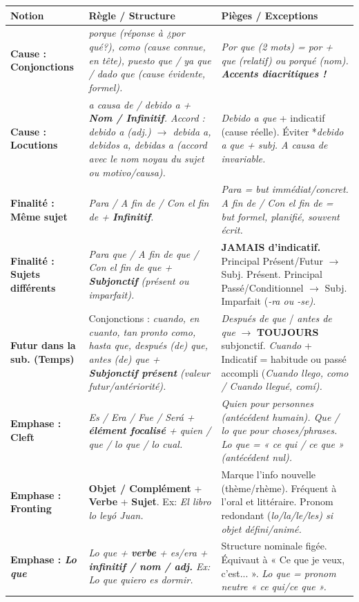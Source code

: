 \documentclass[11pt]{article}
\newcommand{\esp}[1]{\ifmmode\text{\textit{#1}}\else\begingroup\selectlanguage{spanish}\itshape #1\endgroup\fi}
\begin{document}
\begin{propriete}
\begin{center}
\begin{tabularx}{\linewidth}{|p{3.2cm}|X|X|}
\hline
\rowcolor{popblueL}
\textbf{Notion} & \textbf{Règle / Structure} & \textbf{Pièges / Exceptions} \\
\hline
\textbf{Cause : Conjonctions} & \esp{porque} (réponse à \esp{¿por qué?}), \esp{como} (cause connue, en tête), \esp{puesto que / ya que / dado que} (cause évidente, formel). & \esp{Por que} (2 mots) = \esp{por} + \esp{que} (relatif) ou \esp{porqué} (nom). \textbf{Accents diacritiques !} \\
\hline
\textbf{Cause : Locutions} & \esp{a causa de} / \esp{debido a} + \textbf{Nom / Infinitif}. Accord : \esp{debido a} (adj.) $\rightarrow$ \esp{debida a}, \esp{debidos a}, \esp{debidas a} (accord avec le nom noyau du sujet ou \textit{motivo/causa}). & \textit{Debido a que} + indicatif (cause réelle). Éviter *\esp{debido a que} + subj. \esp{A causa de} invariable. \\
\hline
\textbf{Finalité : Même sujet} & \esp{Para / A fin de / Con el fin de} + \textbf{Infinitif}. & \esp{Para} = but immédiat/concret. \esp{A fin de / Con el fin de} = but formel, planifié, souvent écrit. \\
\hline
\textbf{Finalité : Sujets différents} & \esp{Para que / A fin de que / Con el fin de que} + \textbf{Subjonctif} (présent ou imparfait). & \textbf{JAMAIS d'indicatif.} Principal Présent/Futur $\rightarrow$ Subj. Présent. Principal Passé/Conditionnel $\rightarrow$ Subj. Imparfait (\esp{-ra} ou \esp{-se}). \\
\hline
\textbf{Futur dans la sub. (Temps)} & Conjonctions : \esp{cuando, en cuanto, tan pronto como, hasta que, después (de) que, antes (de) que} + \textbf{Subjonctif présent} (valeur futur/antériorité). & \textit{Después de que} / \textit{antes de que} $\rightarrow$ \textbf{TOUJOURS} subjonctif. \textit{Cuando} + Indicatif = habitude ou passé accompli (\esp{Cuando llego, como} / \esp{Cuando llegué, comí}). \\
\hline
\textbf{Emphase : Cleft} & \esp{Es / Era / Fue / Será} + \textbf{élément focalisé} + \esp{quien / que / lo que / lo cual}. & \esp{Quien} pour personnes (antécédent humain). \esp{Que / lo que} pour choses/phrases. \esp{Lo que} = « ce qui / ce que » (antécédent nul). \\
\hline
\textbf{Emphase : Fronting} & \textbf{Objet / Complément} + \textbf{Verbe} + \textbf{Sujet}. Ex: \esp{El libro lo leyó Juan.} & Marque l'info nouvelle (thème/rhème). Fréquent à l'oral et littéraire. Pronom redondant (\esp{lo/la/le/les}) si objet défini/animé. \\
\hline
\textbf{Emphase : \textit{Lo que}} & \esp{Lo que} + \textbf{verbe} + \esp{es/era} + \textbf{infinitif / nom / adj.} Ex: \esp{Lo que quiero es dormir.} & Structure nominale figée. Équivaut à « Ce que je veux, c'est... ». \esp{Lo que} = pronom neutre « ce qui/ce que ». \\
\hline
\end{tabularx}
\end{center}
\end{propriete}
\end{document}
